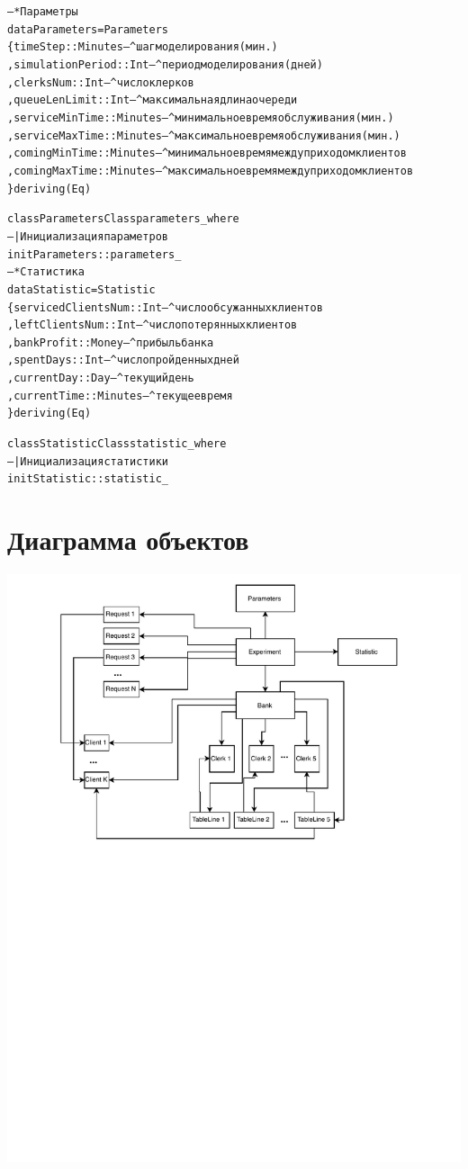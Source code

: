 \documentclass[oneside,final,12pt]{article}
\begin{document}
\begin{alltt}
-- * Параметры
data Parameters = Parameters
\{ timeStep         :: Minutes -- ^ шаг моделирования (мин.)
	, simulationPeriod :: Int     -- ^ период моделирования (дней)
	, clerksNum        :: Int     -- ^ число клерков
	, queueLenLimit    :: Int     -- ^ максимальная длина очереди
	, serviceMinTime   :: Minutes -- ^ минимальное время обслуживания (мин.)
	, serviceMaxTime   :: Minutes -- ^ максимальное время обслуживания (мин.)
	, comingMinTime    :: Minutes -- ^ минимальное время между приходом клиентов
	, comingMaxTime    :: Minutes -- ^ максимальное время между приходом клиентов
\} deriving (Eq)

class ParametersClass parameters_ where
-- | Инициализация параметров
initParameters :: parameters_
 \\

-- * Статистика
data Statistic = Statistic
\{ servicedClientsNum   :: Int     -- ^ число обсужанных клиентов
	, leftClientsNum       :: Int     -- ^ число потерянных клиентов
	, bankProfit           :: Money   -- ^ прибыль банка
	, spentDays            :: Int     -- ^ число пройденных дней
	, currentDay           :: Day     -- ^ текущий день
	, currentTime          :: Minutes -- ^ текущее время
\} deriving (Eq)

class StatisticClass statistic_ where
-- | Инициализация статистики
initStatistic :: statistic_

\end{alltt}
\newpage
\section{Диаграмма объектов}

\includegraphics[width=180mm]{objects.pdf}
\newpage
\end{document}
